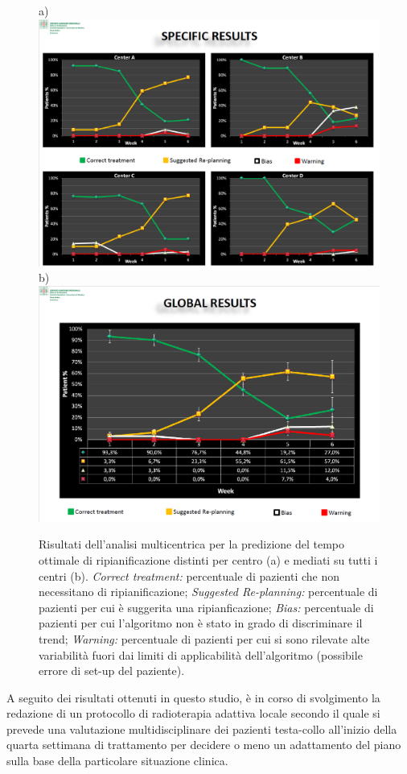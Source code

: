 \begin{figure}
\centering
a)\includegraphics[width=.95\textwidth]{./cap3/Modena_specRes.png}\\
b)\includegraphics[width=.95\textwidth]{./cap3/Modena_globRes.png}
\caption{Risultati dell'analisi multicentrica per la predizione del tempo ottimale di ripianificazione distinti per centro (a) e mediati su tutti i centri (b). \textit{Correct treatment:} percentuale di pazienti che non necessitano di ripianificazione; \textit{Suggested Re-planning:} percentuale di pazienti per cui è suggerita una ripianficazione; \textit{Bias:} percentuale di pazienti per cui l'algoritmo non è stato in grado di discriminare il trend; \textit{Warning:} percentuale di pazienti per cui si sono rilevate alte variabilità fuori dai limiti di applicabilità dell'algoritmo (possibile errore di set-up del paziente).}
\label{fig:Modena_results}
\end{figure}

A seguito dei risultati ottenuti in questo studio, è in corso di svolgimento la redazione di un protocollo di radioterapia adattiva locale secondo il quale si prevede una valutazione multidisciplinare dei pazienti testa-collo all'inizio della quarta settimana di trattamento per decidere o meno un adattamento del piano sulla base della particolare situazione clinica. 

